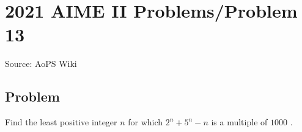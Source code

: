 \documentclass[12pt]{article}
\begin{document}
\section*{{2021 AIME II Problems/Problem 13}}
Source: AoPS Wiki

\subsection*{Problem}
Find the least positive integer $n$ for which $2^n + 5^n - n$ is a multiple of $1000$ .
\end{document}
